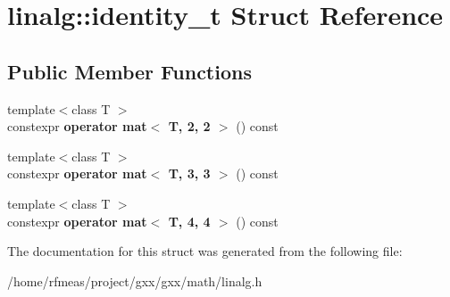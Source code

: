 \hypertarget{structlinalg_1_1identity__t}{}\section{linalg\+:\+:identity\+\_\+t Struct Reference}
\label{structlinalg_1_1identity__t}
\subsection*{Public Member Functions}
\begin{DoxyCompactItemize}
\item 
{\footnotesize template$<$class T $>$ }\\constexpr {\bfseries operator mat$<$ T, 2, 2 $>$} () const \hypertarget{structlinalg_1_1identity__t_a868016616d4f59f60b1975566f02df39}{}\label{structlinalg_1_1identity__t_a868016616d4f59f60b1975566f02df39}

\item 
{\footnotesize template$<$class T $>$ }\\constexpr {\bfseries operator mat$<$ T, 3, 3 $>$} () const \hypertarget{structlinalg_1_1identity__t_af95fddf06f57eafa902f1f837134f71a}{}\label{structlinalg_1_1identity__t_af95fddf06f57eafa902f1f837134f71a}

\item 
{\footnotesize template$<$class T $>$ }\\constexpr {\bfseries operator mat$<$ T, 4, 4 $>$} () const \hypertarget{structlinalg_1_1identity__t_a82563d4a7543c62dd9d00e068f132e84}{}\label{structlinalg_1_1identity__t_a82563d4a7543c62dd9d00e068f132e84}

\end{DoxyCompactItemize}


The documentation for this struct was generated from the following file\+:\begin{DoxyCompactItemize}
\item 
/home/rfmeas/project/gxx/gxx/math/linalg.\+h\end{DoxyCompactItemize}
